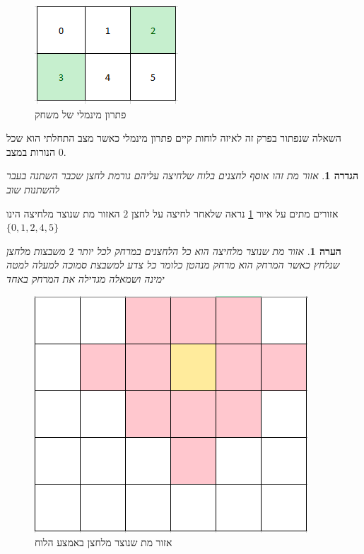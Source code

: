 \documentclass[12pt,leqno]{article}
\theoremstyle{theoremdd}
\newtheorem{definition}{הגדרה}[section]
\newtheorem{comm}{הערה}[section]
\begin{document}
\begin{figure}[ht]
    \caption{פתרון מינמלי של משחק}
    \label{fig: min sol 2x3}
    \centering
    \includegraphics[width=.7\textwidth,height=.7\textheight,keepaspectratio]{images/min_sol_2x3.PNG}
\end{figure}

השאלה שנפתור בפרק זה לאיזה לוחות קיים פתרון מינמלי כאשר מצב התחלתי הוא שכל הנורות במצב
$0$.

\begin{definition}
    \label{def: dead zone}
    אזור מת זהו אוסף לחצנים בלוח
    שלחיצה עליהם 
    גורמת לחצן שכבר השתנה בעבר להשתנות שוב
\end{definition}

אזורים מתים על איור 
\ref{fig: min sol 2x3}
נראה שלאחר לחיצה על
לחצן
$2$
האזור מת שנוצר מלחיצה הינו
$\{0,1,2,4,5\}$

\begin{comm}
    אזור מת שנוצר מלחיצה 
    הוא כל הלחצנים במרחק לכל יותר 
    $2$
    משבצות מלחצן שנלחץ
    כאשר המרחק הוא מרחק מנהטן כלומר כל צדע למשבצת סמוכה למעלה למטה ימינה ושמאלה מגדילה את המרחק באחד
\end{comm}

\begin{figure}[ht]
    \caption{אזור מת שנוצר מלחצן באמצע הלוח}
    \label{fig: dead zone}
    \centering
    \includegraphics[width=.7\textwidth,height=.7\textheight,keepaspectratio]{images/dead_zone.PNG}
\end{figure}
\end{document}
